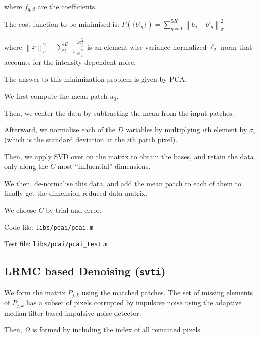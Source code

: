 \documentclass[fleqn, 11pt]{article}
\newcommand\norm[1]{\left\lVert#1\right\rVert}
\begin{document}
 where $f_{q,d}$ are the coefficients. 

\medskip

The cost function to be minimised is: $F(\{b'_q\}) = \displaystyle \sum_{q=1}^{5K} \norm{b_q - b'_q}_{\sigma}^2  $

where $\norm{x}_{\sigma}^2 = \displaystyle \sum_{i=1}^D \dfrac{x_i^2}{\sigma_i^2} $ 
is an element-wise variance-normalized
$\ell_2$ norm that accounts for the intensity-dependent noise.

\medskip

The answer to this minimization problem is given by PCA.

\bigskip

We first compute the mean patch $u_0$.

Then, we center the data by subtracting the mean from the input patches. 

Afterward, we normalise each of the $D$ variables by multiplying $i$th element by 
$\sigma_i$ (which is the standard deviation at the $i$th patch pixel). 

\medskip

Then, we apply SVD over on the matrix to obtain the bases, and 
retain the data only along the $C$ 
most ``influential'' dimensions. 

\medskip

We then, de-normalise this data, and add the mean patch 
to each of them to finally get the dimension-reduced data matrix. 

We choose $C$ by trial and error.

\medskip

Code file: \texttt{libs/pcai/pcai.m}

Test file: \texttt{libs/pcai/pcai\_test.m}

\bigskip

\newpage 

\subsection*{LRMC based Denoising (\texttt{svti})}

We form the matrix $P_{j,k}$ using the matched patches. 
The set of missing elements of $P_{j,k}$ has a subset of pixels 
corrupted by impulsive noise using 
the adaptive median filter based impulsive noise detector. 

Then, $\Omega$ is formed by including 
the index of all remained pixels. 

\medskip
\end{document}
